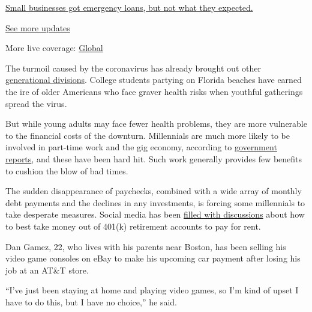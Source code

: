 \href{https://www.nytimes3xbfgragh.onion/live/2020/08/03/business/stock-market-today-coronavirus?action=click\&pgtype=Article\&state=default\&region=MAIN_CONTENT_1\&context=storylines_live_updates\#small-businesses-got-emergency-loans-but-not-what-they-expected}{Small
businesses got emergency loans, but not what they expected.}

\href{https://www.nytimes3xbfgragh.onion/live/2020/08/03/business/stock-market-today-coronavirus?action=click\&pgtype=Article\&state=default\&region=MAIN_CONTENT_1\&context=storylines_live_updates}{See
more updates}

More live coverage:
\href{https://www.nytimes3xbfgragh.onion/2020/08/03/world/coronavirus-covid-19.html?action=click\&pgtype=Article\&state=default\&region=MAIN_CONTENT_1\&context=storylines_live_updates}{Global}

The turmoil caused by the coronavirus has already brought out other
\href{https://www.nytimes3xbfgragh.onion/2020/03/18/world/europe/shutdowns-coronavirus-age.html}{generational
divisions}. College students partying on Florida beaches have earned the
ire of older Americans who face graver health risks when youthful
gatherings spread the virus.

But while young adults may face fewer health problems, they are more
vulnerable to the financial costs of the downturn. Millennials are much
more likely to be involved in part-time work and the gig economy,
according to
\href{https://www.federalreserve.gov/publications/files/2017-report-economic-well-being-us-households-201805.pdf}{government
reports}, and these have been hard hit. Such work generally provides few
benefits to cushion the blow of bad times.

The sudden disappearance of paychecks, combined with a wide array of
monthly debt payments and the declines in any investments, is forcing
some millennials to take desperate measures. Social media has been
\href{https://www.reddit.com/r/personalfinance/comments/fmtvej/can_i_make_a_hardship_withdrawal_from_my_401k/}{filled
with discussions} about how to best take money out of 401(k) retirement
accounts to pay for rent.

Dan Gamez, 22, who lives with his parents near Boston, has been selling
his video game consoles on eBay to make his upcoming car payment after
losing his job at an AT\&T store.

``I've just been staying at home and playing video games, so I'm kind of
upset I have to do this, but I have no choice,'' he said.

